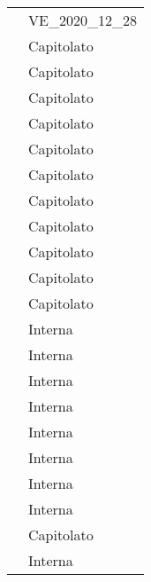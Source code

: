 \begin{longtable}{C{6cm} C{6cm}}
	 & VE\_2020\_12\_28 \\
	
     & Capitolato \\
	
     & Capitolato \\
    
     & Capitolato \\
    
     & Capitolato \\
    
     & Capitolato \\
    
     & Capitolato \\
    
     & Capitolato \\
    
     & Capitolato \\
    
     & Capitolato \\
    
     & Capitolato \\
    
     & Capitolato \\
    
     & Interna \\
    
     & Interna \\
    
     & Interna \\
    
     & Interna \\
    
     & Interna \\
    
     & Interna \\
    
     & Interna \\
    
     & Interna \\
    
     & Capitolato \\

	 & Interna \\
    
\end{longtable}